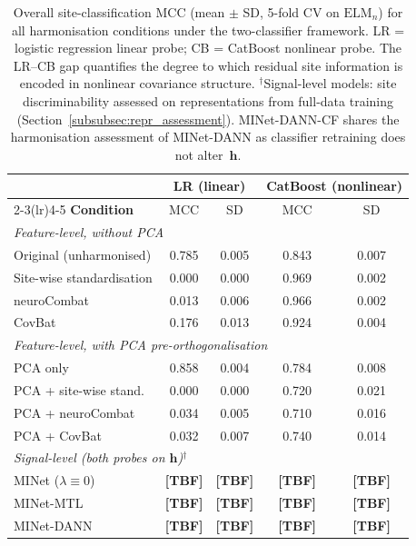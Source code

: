 \documentclass[preprint,12pt]{elsarticle}
\begin{document}
\begin{table}[htbp]
  \centering
  \caption{Overall site-classification MCC (mean $\pm$ SD, 5-fold CV
    on $\mathrm{ELM}_n$) for all harmonisation conditions under the
    two-classifier framework.
    LR = logistic regression linear probe; CB = CatBoost nonlinear
    probe.
    The LR--CB gap quantifies the degree to which residual site
    information is encoded in nonlinear covariance structure.
    $^\dagger$Signal-level models: site discriminability assessed on
    representations from full-data training
    (Section~\ref{subsubsec:repr_assessment}).
    MINet-DANN-CF shares the harmonisation assessment of MINet-DANN
    as classifier retraining does not alter~$\mathbf{h}$.}
  \label{tab:site_class_harmonisation}
  \begin{tabular}{lcccc}
    \toprule
    & \multicolumn{2}{c}{\textbf{LR (linear)}}
    & \multicolumn{2}{c}{\textbf{CatBoost (nonlinear)}} \\
    \cmidrule(lr){2-3}\cmidrule(lr){4-5}
    \textbf{Condition} & MCC & SD & MCC & SD \\
    \midrule
    \multicolumn{5}{l}{\textit{Feature-level, without PCA}} \\
    \quad Original (unharmonised)
     & 0.785 & 0.005 & 0.843 & 0.007 \\
    \quad Site-wise standardisation
      & 0.000 & 0.000 & 0.969 & 0.002 \\
    \quad neuroCombat
      & 0.013 & 0.006 & 0.966 & 0.002 \\
    \quad CovBat
      & 0.176 & 0.013 & 0.924 & 0.004 \\
    \midrule
    \multicolumn{5}{l}{\textit{Feature-level, with PCA
      pre-orthogonalisation}} \\
    \quad PCA only
      & 0.858 & 0.004 & 0.784 & 0.008 \\
    \quad PCA + site-wise stand.
      & 0.000 & 0.000 & 0.720 & 0.021 \\
    \quad PCA + neuroCombat
      & 0.034 & 0.005 & 0.710 & 0.016 \\
    \quad PCA + CovBat
      & 0.032 & 0.007 & 0.740 & 0.014 \\
    \midrule
    \multicolumn{5}{l}{\textit{Signal-level (both probes on
      $\mathbf{h}$)$^\dagger$}} \\
    \quad MINet ($\lambda \equiv 0$)
      & \textbf{[TBF]} & \textbf{[TBF]}
      & \textbf{[TBF]} & \textbf{[TBF]} \\
    \quad MINet-MTL
      & \textbf{[TBF]} & \textbf{[TBF]}
      & \textbf{[TBF]} & \textbf{[TBF]} \\
    \quad MINet-DANN
      & \textbf{[TBF]} & \textbf{[TBF]}
      & \textbf{[TBF]} & \textbf{[TBF]} \\
    \bottomrule
  \end{tabular}
\end{table}
\end{document}
